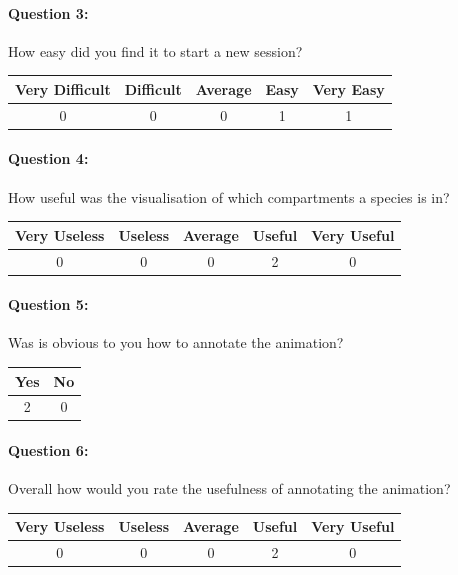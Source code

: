 \paragraph*{Question 3: } How easy did you find it to start a new session?

\begin{center}
\begin{tabular}{ | c | c | c | c | c |}
    \hline
    Very Difficult & Difficult & Average & Easy & Very Easy \\
    \hline
    0 & 0 & 0 & 1 & 1 \\
    \hline
\end{tabular}
\end{center}

\paragraph*{Question 4: } How useful was the visualisation of which compartments a species is in?

\begin{center}
\begin{tabular}{ | c | c | c | c | c |}
    \hline
    Very Useless & Useless  & Average & Useful & Very Useful \\
    \hline
    0 & 0 & 0 & 2 & 0 \\
    \hline
\end{tabular}
\end{center}

\paragraph*{Question 5: } Was is obvious to you how to annotate the animation?

\begin{center}
\begin{tabular}{ | c | c |}
    \hline
    Yes & No\\
    \hline
    2 & 0 \\
    \hline
\end{tabular}
\end{center}


\paragraph*{Question 6: } Overall how would you rate the usefulness of annotating the animation?

\begin{center}
\begin{tabular}{ | c | c | c | c | c |}
    \hline
    Very Useless & Useless  & Average & Useful & Very Useful \\
    \hline
    0 & 0 & 0 & 2 & 0 \\
    \hline
\end{tabular}
\end{center}

